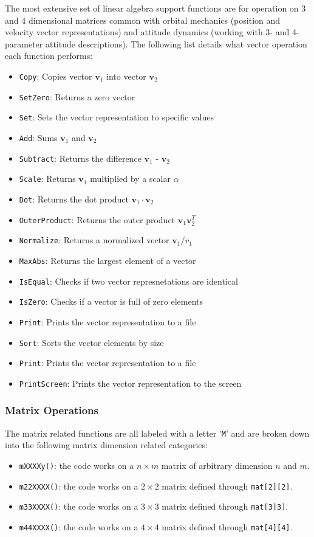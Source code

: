 The most extensive set of linear algebra support functions are for operation on 3 and 4 dimensional matrices common with orbital mechanics (position and velocity vector representations) and attitude dynamics (working with 3- and 4-parameter attitude descriptions).  The following list details what vector operation each function performs:
\begin{itemize}
	\item {\tt Copy}: Copies vector $\bm v_{1}$ into vector $\bm v_{2}$
	\item {\tt SetZero}: Returns a zero vector
	\item {\tt Set}: Sets the vector representation to specific values
	\item {\tt Add}: Sums  $\bm v_{1}$ and  $\bm v_{2}$
	\item {\tt Subtract}: Returns the difference  $\bm v_{1}$ - $\bm v_{2}$
	\item {\tt Scale}: Returns $\bm v_{1}$ multiplied by a scalar $\alpha$
	\item {\tt Dot}: Returns the dot product $\bm v_{1} \cdot \bm v_{2}$
	\item {\tt OuterProduct}: Returns the outer product $\bm v_{1} \bm v_{2}^{T}$
	\item {\tt Normalize}: Returns a normalized vector $\bm v_{1}/ v_{1}$
	\item {\tt MaxAbs}: Returns the largest element of a vector
	\item {\tt IsEqual}: Checks if two vector represnetations are identical
	\item {\tt IsZero}: Checks if a vector is full of zero elements
	\item {\tt Print}: Prints the vector representation to a file
	\item {\tt Sort}: Sorts the vector elements by size
	\item {\tt Print}: Prints the vector representation to a file
	\item {\tt PrintScreen}: Prints the vector representation to the screen
\end{itemize}





\subsubsection{Matrix Operations}
The matrix related functions are all labeled with a letter '{\tt M}' and are broken down into the following matrix dimension related categories:
\begin{itemize}
	\item  {\tt mXXXXy()}: the code works on a $n\times m$ matrix of arbitrary dimension $n$ and $m$.
	\item {\tt m22XXXX()}: the code works on a $2\times 2$ matrix defined through {\tt mat[2][2]}.
	\item {\tt m33XXXX()}: the code works on a $3\times 3$ matrix defined through {\tt mat[3]3]}.
	\item {\tt m44XXXX()}: the code works on a $4\times 4$ matrix defined through {\tt mat[4][4]}.
\end{itemize}

